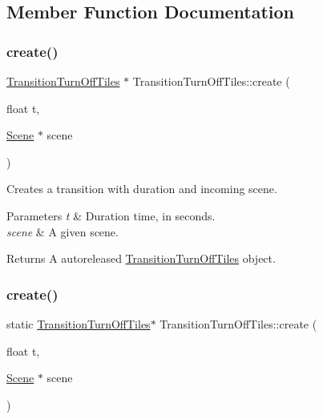 \subsection{Member Function Documentation}
\mbox{\label{classTransitionTurnOffTiles_a48d64044718b506ad3c84e38664c938f}} 
\subsubsection{\texorpdfstring{create()}{create()}\hspace{0.1cm}{\footnotesize\ttfamily [1/2]}}
{\footnotesize\ttfamily \hyperlink{classTransitionTurnOffTiles}{Transition\+Turn\+Off\+Tiles} $\ast$ Transition\+Turn\+Off\+Tiles\+::create (\begin{DoxyParamCaption}\item[{float}]{t,  }\item[{\hyperlink{classScene}{Scene} $\ast$}]{scene }\end{DoxyParamCaption})\hspace{0.3cm}{\ttfamily [static]}}

Creates a transition with duration and incoming scene.


\begin{DoxyParams}{Parameters}
{\em t} & Duration time, in seconds. \\
\hline
{\em scene} & A given scene. \\
\hline
\end{DoxyParams}
\begin{DoxyReturn}{Returns}
A autoreleased \hyperlink{classTransitionTurnOffTiles}{Transition\+Turn\+Off\+Tiles} object. 
\end{DoxyReturn}
\mbox{\label{classTransitionTurnOffTiles_a33900f50c002668aefb782838bd9cb14}} 
\subsubsection{\texorpdfstring{create()}{create()}\hspace{0.1cm}{\footnotesize\ttfamily [2/2]}}
{\footnotesize\ttfamily static \hyperlink{classTransitionTurnOffTiles}{Transition\+Turn\+Off\+Tiles}$\ast$ Transition\+Turn\+Off\+Tiles\+::create (\begin{DoxyParamCaption}\item[{float}]{t,  }\item[{\hyperlink{classScene}{Scene} $\ast$}]{scene }\end{DoxyParamCaption})\hspace{0.3cm}{\ttfamily [static]}}

